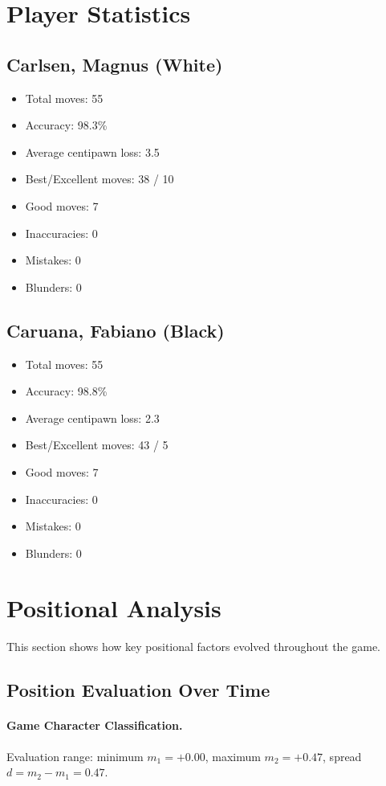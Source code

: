 \documentclass[11pt]{book}
\begin{document}
\section{Player Statistics}

\subsection{Carlsen, Magnus (White)}
\begin{itemize}
\item Total moves: 55
\item Accuracy: 98.3\%
\item Average centipawn loss: 3.5
\item Best/Excellent moves: 38 / 10
\item Good moves: 7
\item Inaccuracies: 0
\item Mistakes: 0
\item Blunders: 0
\end{itemize}

\subsection{Caruana, Fabiano (Black)}
\begin{itemize}
\item Total moves: 55
\item Accuracy: 98.8\%
\item Average centipawn loss: 2.3
\item Best/Excellent moves: 43 / 5
\item Good moves: 7
\item Inaccuracies: 0
\item Mistakes: 0
\item Blunders: 0
\end{itemize}

\section{Positional Analysis}

This section shows how key positional factors evolved throughout the game.

\subsection{Position Evaluation Over Time}

\paragraph{Game Character Classification.}
Evaluation range: minimum $m_1 = +0.00$, maximum $m_2 = +0.47$, spread $d = m_2 - m_1 = 0.47$.
\end{document}
